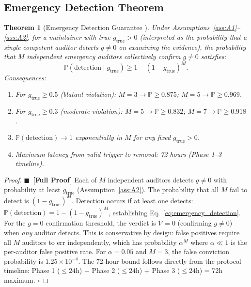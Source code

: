 \documentclass[12pt,a4paper]{article}
\newtheorem{theorem}{Theorem}[section]
\theoremstyle{definition}
\newcommand{\rigorFull}[0]{$\blacksquare$~\textbf{[Full Proof]}}
\newcommand{\Pbb}{\mathbb{P}}
\newcommand{\gzero}{g=0}
\newcommand{\gnonzero}{g \neq 0}
\newcommand{\AuditResult}{\mathcal{V}}
\begin{document}
\subsection{Emergency Detection Theorem}
\begin{theorem}[Emergency Detection Guarantee ]
\label{thm:emergency}
Under Assumptions~\ref{ass:A1}--\ref{ass:A2}, for a maintainer with true $g_{\mathrm{true}} > 0$ (interpreted as the probability that a single competent auditor detects $\gnonzero$ on examining the evidence), the probability that $M$ independent emergency auditors collectively confirm $\gnonzero$ satisfies:
\begin{equation}
    \Pbb(\text{detection} \mid g_{\mathrm{true}}) \geq 1 - (1 - g_{\mathrm{true}})^{M}.
    \label{eq:emergency_detection}
\end{equation}
Consequences:
\begin{enumerate}[label=(\roman*)]
    \item For $g_{\mathrm{true}} \geq 0.5$ (blatant violation): $M=3 \to \Pbb \geq 0.875$; $M=5 \to \Pbb \geq 0.969$.
    \item For $g_{\mathrm{true}} \geq 0.3$ (moderate violation): $M=5 \to \Pbb \geq 0.832$; $M=7 \to \Pbb \geq 0.918$.
    \item $\Pbb(\text{detection}) \to 1$ exponentially in $M$ for any fixed $g_{\mathrm{true}} > 0$.
    \item Maximum latency from valid trigger to removal: 72 hours (Phase 1--3 timeline).
\end{enumerate}
\end{theorem}
\begin{proof}\rigorFull
Each of $M$ independent auditors detects $\gnonzero$ with probability at least $g_{\mathrm{true}}$ (Assumption~\ref{ass:A2}). The probability that all $M$ fail to detect is $(1 - g_{\mathrm{true}})^M$. Detection occurs if at least one detects: $\Pbb(\text{detection}) = 1 - (1 - g_{\mathrm{true}})^M$, establishing Eq.~\eqref{eq:emergency_detection}.
For the $\gzero$ confirmation threshold, the verdict is $\AuditResult = 0$ (confirming $\gnonzero$) when \textit{any} auditor detects. This is conservative by design: false positives require all $M$ auditors to err independently, which has probability $\alpha^M$ where $\alpha \ll 1$ is the per-auditor false positive rate. For $\alpha = 0.05$ and $M = 3$, the false conviction probability is $1.25 \times 10^{-4}$.
The 72-hour bound follows directly from the protocol timeline: Phase 1 ($\leq 24$h) + Phase 2 ($\leq 24$h) + Phase 3 ($\leq 24$h) = 72h maximum. $\square$
\end{proof}
\end{document}
